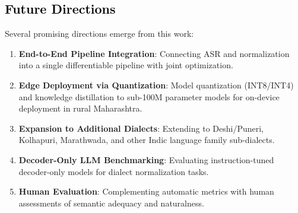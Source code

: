 \subsection{\textcolor{black}{Future Directions}}

Several promising directions emerge from this work:
\begin{enumerate}
    \item \textbf{End-to-End Pipeline Integration}: Connecting ASR and normalization into a single differentiable pipeline with joint optimization.
    \item \textbf{Edge Deployment via Quantization}: Model quantization (INT8/INT4) and knowledge distillation to sub-100M parameter models for on-device deployment in rural Maharashtra.
    \item \textbf{Expansion to Additional Dialects}: Extending to Deshi/Puneri, Kolhapuri, Marathwada, and other Indic language family sub-dialects.
    \item \textbf{Decoder-Only LLM Benchmarking}: Evaluating instruction-tuned decoder-only models for dialect normalization tasks.
    \item \textbf{Human Evaluation}: Complementing automatic metrics with human assessments of semantic adequacy and naturalness.
\end{enumerate}
